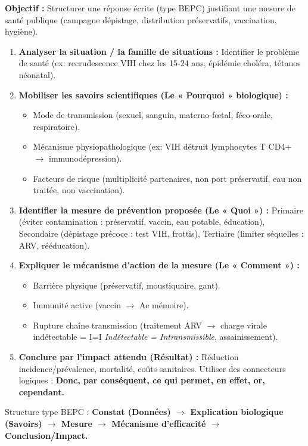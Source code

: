 \documentclass[11pt]{article}
\newcommand{\cle}[1]{{\popxbold\color{popdark}#1}}
\begin{document}
\begin{methode}
    \textbf{Objectif :} Structurer une réponse écrite (type BEPC) justifiant une mesure de santé publique (campagne dépistage, distribution préservatifs, vaccination, hygiène).
    \begin{enumerate}
        \item \textbf{Analyser la situation / la famille de situations :} Identifier le problème de santé (ex: recrudescence VIH chez les 15-24 ans, épidémie choléra, tétanos néonatal).
        \item \textbf{Mobiliser les savoirs scientifiques (Le « Pourquoi » biologique) :}
            \begin{itemize}
                \item Mode de transmission (sexuel, sanguin, materno-fœtal, féco-orale, respiratoire).
                \item Mécanisme physiopathologique (ex: VIH détruit lymphocytes T CD4+ $\rightarrow$ immunodépression).
                \item Facteurs de risque (multiplicité partenaires, non port préservatif, eau non traitée, non vaccination).
            \end{itemize}
        \item \textbf{Identifier la mesure de prévention proposée (Le « Quoi ») :} Primaire (éviter contamination : préservatif, vaccin, eau potable, éducation), Secondaire (dépistage précoce : test VIH, frottis), Tertiaire (limiter séquelles : ARV, rééducation).
        \item \textbf{Expliquer le mécanisme d'action de la mesure (Le « Comment ») :}
            \begin{itemize}
                \item Barrière physique (préservatif, moustiquaire, gant).
                \item Immunité active (vaccin $\rightarrow$ Ac mémoire).
                \item Rupture chaîne transmission (traitement ARV $\rightarrow$ charge virale indétectable = I=I \textit{Indétectable = Intransmissible}, assainissement).
            \end{itemize}
        \item \textbf{Conclure par l'impact attendu (Résultat) :} Réduction incidence/prévalence, mortalité, coûts sanitaires. Utiliser des connecteurs logiques : \textbf{Donc, par conséquent, ce qui permet, en effet, or, cependant.}
    \end{enumerate}
    \cle{Structure type BEPC} : \textbf{Constat (Données) $\rightarrow$ Explication biologique (Savoirs) $\rightarrow$ Mesure $\rightarrow$ Mécanisme d'efficacité $\rightarrow$ Conclusion/Impact.}
\end{methode}
\end{document}
